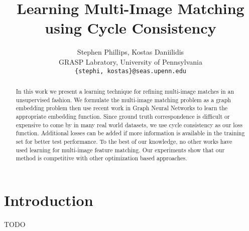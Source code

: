 \documentclass[10pt,twocolumn,letterpaper]{article}
\begin{document}
\title{Learning Multi-Image Matching using Cycle Consistency}

\author{Stephen Phillips, Kostas Daniilidis \\
GRASP Labratory, University of Pennsylvania\\
{\tt\small \{stephi, kostas\}@seas.upenn.edu}
}

\maketitle


\begin{abstract}
   In this work we present a learning technique for refining multi-image matches in an unsupervised fashion.
   We formulate the multi-image matching problem as a graph embedding problem then use recent work in Graph Neural Networks to learn the appropriate embedding function.
   Since ground truth correspondence is difficult or expensive to come by in many real world datasets, we use cycle consistency as our loss function.
   Additional losses can be added if more information is available in the training set for better test performance.
   To the best of our knowledge, no other works have used learning for multi-image feature matching.
   Our experiments show that our method is competitive with other optimization based approaches.
\end{abstract}

\section{Introduction}

TODO
\end{document}

